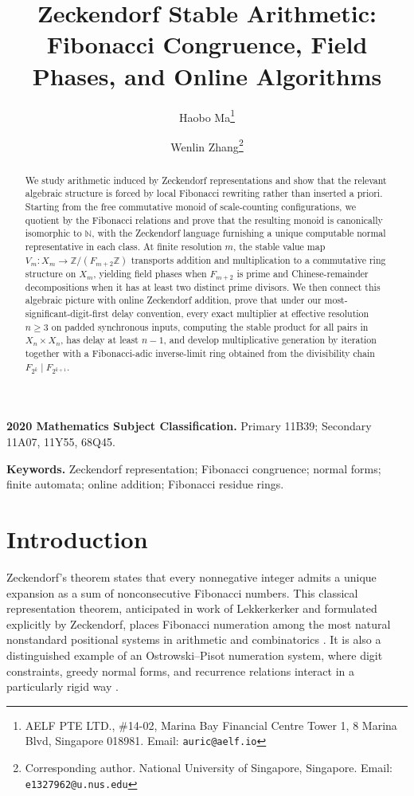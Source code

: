 \documentclass[12pt,a4paper]{article}
\title{Zeckendorf Stable Arithmetic:\\
Fibonacci Congruence, Field Phases, and Online Algorithms}
\author{
  Haobo Ma\thanks{AELF PTE LTD., \#14-02, Marina Bay Financial Centre Tower 1, 8 Marina Blvd, Singapore 018981. Email: \texttt{auric@aelf.io}}
  \and
  Wenlin Zhang\thanks{Corresponding author. National University of Singapore, Singapore. Email: \texttt{e1327962@u.nus.edu}}
}
\date{}
\theoremstyle{plain}
\theoremstyle{definition}
\numberwithin{equation}{section}
\newcommand{\ZZ}{\mathbb{Z}}
\newcommand{\NN}{\mathbb{N}}
\begin{document}
\maketitle

\begin{abstract}
We study arithmetic induced by Zeckendorf representations and show that the relevant algebraic structure is forced by local Fibonacci rewriting rather than inserted a priori. Starting from the free commutative monoid of scale-counting configurations, we quotient by the Fibonacci relations and prove that the resulting monoid is canonically isomorphic to \(\NN\), with the Zeckendorf language furnishing a unique computable normal representative in each class. At finite resolution \(m\), the stable value map \(V_m:X_m\to \ZZ/(F_{m+2}\ZZ)\) transports addition and multiplication to a commutative ring structure on \(X_m\), yielding field phases when \(F_{m+2}\) is prime and Chinese-remainder decompositions when it has at least two distinct prime divisors. We then connect this algebraic picture with online Zeckendorf addition, prove that under our most-significant-digit-first delay convention, every exact multiplier at effective resolution \(n\ge3\) on padded synchronous inputs, computing the stable product for all pairs in \(X_n\times X_n\), has delay at least \(n-1\), and develop multiplicative generation by iteration together with a Fibonacci-adic inverse-limit ring obtained from the divisibility chain \(F_{2^k}\mid F_{2^{k+1}}\).
\end{abstract}

\noindent\textbf{2020 Mathematics Subject Classification.}
Primary 11B39; Secondary 11A07, 11Y55, 68Q45.

\medskip

\noindent\textbf{Keywords.}
Zeckendorf representation; Fibonacci congruence; normal forms; finite automata; online addition; Fibonacci residue rings.

\section{Introduction}\label{sec:introduction}
Zeckendorf's theorem states that every nonnegative integer admits a unique expansion as a sum of nonconsecutive Fibonacci numbers. This classical representation theorem, anticipated in work of Lekkerkerker and formulated explicitly by Zeckendorf, places Fibonacci numeration among the most natural nonstandard positional systems in arithmetic and combinatorics \cite{Lekkerkerker1952,Zeckendorf1972,Zeckendorf1972Generalized,Koshy2018}. It is also a distinguished example of an Ostrowski--Pisot numeration system, where digit constraints, greedy normal forms, and recurrence relations interact in a particularly rigid way \cite{Fraenkel1985,Frougny1992NumbersAutomata,BerendFrougny1994Pisot}.
\end{document}
